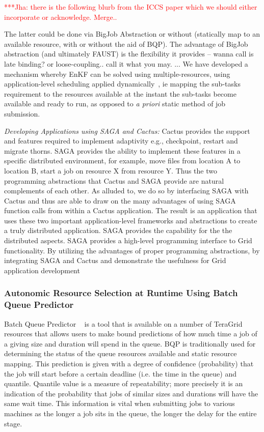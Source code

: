 \documentclass[conference,final]{IEEEtran}
\newcommand{\jhanote}[1]{ {\textcolor{red} { ***Jha: #1 }}}
\newcommand{\jhanote}[1]{}
\begin{document}
\jhanote{there is the following blurb from the ICCS paper which we
  should either incorporate or acknowledge. Merge..}

The latter could be done via BigJob Abstraction or without (statically
map to an available resource, with or without the aid of BQP).  The
advantage of BigJob abstraction (and ultimately FAUST) is the
flexibility it provides -- wanna call is late binding? or
loose-coupling..  call it what you may.  ... We have developed a
mechanism whereby EnKF can be solved using multiple-resources, using
application-level scheduling applied dynamically~\cite{saga_tg08}, ie
mapping the sub-tasks requirement to the resources available at the
instant the sub-tasks become available and ready to run, as opposed to
{\it a priori} static method of job submission.

{\it Developing Applications using SAGA and Cactus:} Cactus provides
the support and features required to implement adaptivity e.g.,
checkpoint, restart and migrate thorns. SAGA provides the ability to
implement these features in a specific distributed environment, for
example, move files from location A to location B, start a job on
resource X from resource Y.  Thus the two programming abstractions
that Cactus and SAGA provide are natural complements of each other.
As alluded to, we do so by interfacing SAGA with Cactus and thus are
able to draw on the many advantages of using SAGA function calls from
within a Cactus application.  The result is an application that uses
these two important application-level frameworks and abstractions to
create a truly distributed application.  SAGA provides the capability
for the the distributed aspects. SAGA provides a high-level
programming interface to Grid functionality. By utilizing the
advantages of proper programming abstractions, by integrating SAGA and
Cactus and demonstrate the usefulness for Grid application development

\subsubsection{Autonomic Resource Selection at Runtime Using Batch
  Queue Predictor} 
Batch Queue Predictor ~\cite{bqp, bqp_url} is a tool that is available
on a number of TeraGrid resources that allows users to make bound
predictions of how much time a job of a giving size and duration will
spend in the queue.  BQP is traditionally used for determining the
status of the queue resources available and static resource
mapping. This prediction is given with a degree of confidence
(probability) that the job will start before a certain deadline
(i.e. the time in the queue) and quantile. Quantile value is a measure
of repeatability; more precisely it is an indication of the
probability that jobs of similar sizes and durations will have the
same wait time. This information is vital when submitting jobs to
various machines as the longer a job sits in the queue, the longer the
delay for the entire stage.
\end{document}
